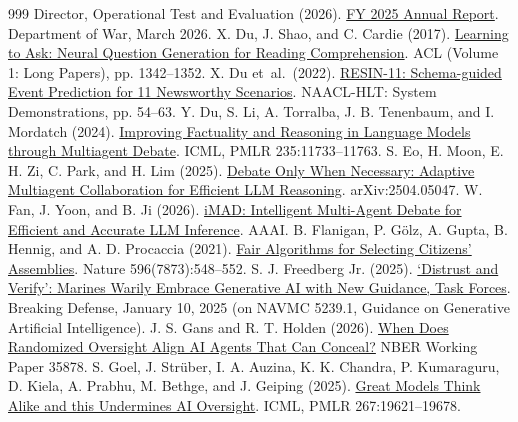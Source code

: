 \documentclass[12pt,letterpaper]{article}
\begin{document}
\begin{thebibliography}{999}
 Director, Operational Test and Evaluation (2026). \href{https://www.dote.osd.mil/Portals/97/pub/reports/FY2025/Other/2025Annual-Report.pdf}{FY 2025 Annual Report}. Department of War, March 2026.
 X. Du, J. Shao, and C. Cardie (2017). \href{https://doi.org/10.18653/v1/P17-1123}{Learning to Ask: Neural Question Generation for Reading Comprehension}. ACL (Volume 1: Long Papers), pp. 1342--1352.
 X. Du et~al.\ (2022). \href{https://doi.org/10.18653/v1/2022.naacl-demo.7}{RESIN-11: Schema-guided Event Prediction for 11 Newsworthy Scenarios}. NAACL-HLT: System Demonstrations, pp. 54--63.
 Y. Du, S. Li, A. Torralba, J. B. Tenenbaum, and I. Mordatch (2024). \href{https://proceedings.mlr.press/v235/du24e.html}{Improving Factuality and Reasoning in Language Models through Multiagent Debate}. ICML, PMLR 235:11733--11763.
 S. Eo, H. Moon, E. H. Zi, C. Park, and H. Lim (2025). \href{https://arxiv.org/abs/2504.05047}{Debate Only When Necessary: Adaptive Multiagent Collaboration for Efficient LLM Reasoning}. arXiv:2504.05047.
 W. Fan, J. Yoon, and B. Ji (2026). \href{https://arxiv.org/abs/2511.11306}{iMAD: Intelligent Multi-Agent Debate for Efficient and Accurate LLM Inference}. AAAI.
 B. Flanigan, P. G{\"o}lz, A. Gupta, B. Hennig, and A. D. Procaccia (2021). \href{https://doi.org/10.1038/s41586-021-03788-6}{Fair Algorithms for Selecting Citizens' Assemblies}. Nature 596(7873):548--552.
 S. J. Freedberg Jr. (2025). \href{https://breakingdefense.com/2025/01/distrust-and-verify-marines-warily-embrace-generative-ai-with-new-guidance-task-forces/}{`Distrust and Verify': Marines Warily Embrace Generative AI with New Guidance, Task Forces}. Breaking Defense, January 10, 2025 (on NAVMC 5239.1, Guidance on Generative Artificial Intelligence).
 J. S. Gans and R. T. Holden (2026). \href{https://www.nber.org/papers/w35878}{When Does Randomized Oversight Align AI Agents That Can Conceal?} NBER Working Paper 35878.
 S. Goel, J. Str\"uber, I. A. Auzina, K. K. Chandra, P. Kumaraguru, D. Kiela, A. Prabhu, M. Bethge, and J. Geiping (2025). \href{https://proceedings.mlr.press/v267/goel25b.html}{Great Models Think Alike and this Undermines AI Oversight}. ICML, PMLR 267:19621--19678.

\end{thebibliography}
\end{document}
